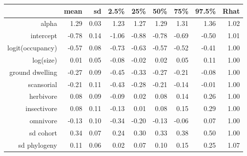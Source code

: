 \begin{table}[ht]
\centering
\begin{tabular}{rrrrrrrrr}
  \hline
 & mean & sd & 2.5\% & 25\% & 50\% & 75\% & 97.5\% & Rhat \\ 
  \hline
alpha & 1.29 & 0.03 & 1.23 & 1.27 & 1.29 & 1.31 & 1.36 & 1.02 \\ 
  intercept & -0.78 & 0.14 & -1.06 & -0.88 & -0.78 & -0.69 & -0.50 & 1.01 \\ 
  logit(occupancy) & -0.57 & 0.08 & -0.73 & -0.63 & -0.57 & -0.52 & -0.41 & 1.00 \\ 
  log(size) & 0.01 & 0.05 & -0.08 & -0.02 & 0.02 & 0.05 & 0.11 & 1.00 \\ 
  ground dwelling & -0.27 & 0.09 & -0.45 & -0.33 & -0.27 & -0.21 & -0.08 & 1.00 \\ 
  scansorial & -0.21 & 0.11 & -0.43 & -0.28 & -0.21 & -0.14 & -0.01 & 1.00 \\ 
  herbivore & 0.08 & 0.09 & -0.09 & 0.02 & 0.08 & 0.14 & 0.26 & 1.00 \\ 
  insectivore & 0.08 & 0.11 & -0.13 & 0.01 & 0.08 & 0.15 & 0.29 & 1.00 \\ 
  omnivore & -0.13 & 0.10 & -0.34 & -0.20 & -0.13 & -0.06 & 0.07 & 1.00 \\ 
  sd cohort & 0.34 & 0.07 & 0.24 & 0.30 & 0.33 & 0.38 & 0.50 & 1.00 \\ 
  sd phylogeny & 0.11 & 0.06 & 0.02 & 0.07 & 0.10 & 0.15 & 0.25 & 1.07 \\ 
   \hline
\end{tabular}
\label{post_sum}
\end{table}
